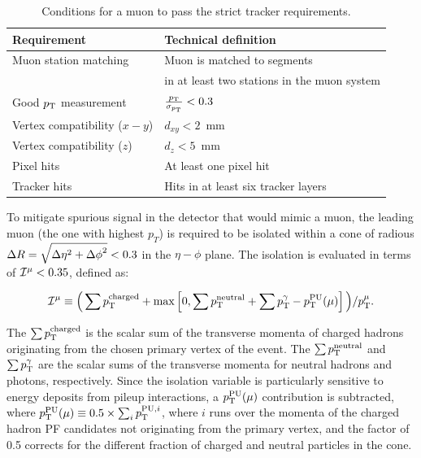 \begin{table}[h]
  \caption{Conditions for a muon to pass the strict tracker requirements.}
    \begin{center}
    \begin{tabular}{l|l}
     \textbf{Requirement}         & \textbf{Technical definition}                 \\
      \hline
      Muon station matching          & Muon is matched to segments           \\
                                     & in at least two stations in the muon system        \\
      \hline                                                          
      Good $p_{\mathrm{T}}$ measurement         & $\frac{p_{\mathrm{T}}}{\sigma_{p_{\mathrm{T}}}} < 0.3$      \\
      \hline
      Vertex compatibility ($x-y$)   & $d_{xy} < 2$~mm                       \\
      \hline
      Vertex compatibility ($z$)     & $d_{z} < 5$~mm                        \\
      \hline
      Pixel hits                     & At least one pixel hit                \\
      \hline
      Tracker hits                   & Hits in at least six tracker layers   \\
      \hline
    \end{tabular}
    
    \label{tab:Tracker_High_pT}
    \end{center}
\end{table}


To mitigate spurious signal in the detector that would mimic a muon, the leading muon (the one with highest $p_T$) is required to be isolated within a cone of radious $\Delta R = \sqrt{\smash[b]{\Delta \eta}^2 + {\Delta \phi}^2}< 0.3$ in the $\eta - \phi$ plane. The isolation is evaluated in terms of ${\cal I}^{\mu} < 0.35$, defined as:


\begin{equation}
\label{eqn:pfiso}
{\cal I}^{\mu} \equiv \Big( \sum p_{\mathrm{T}}^\text{charged} +
                                 \max\left[ 0, \sum p_{\mathrm{T}}^\text{neutral}
                                 +
                                  \sum p_{\mathrm{T}}^{\gamma}
                                 - p_{\mathrm{T}}^\mathrm{PU}(\mu) \right] \Big)
                                 / p_{\mathrm{T}}^{\mu}.
\end{equation}


The $\sum p_{\mathrm{T}}^\text{charged}$ is the scalar sum of the transverse momenta of charged hadrons originating from the chosen primary vertex of the event. The $\sum p_{\mathrm{T}}^\text{neutral}$ and $\sum p_{\mathrm{T}}^{\gamma}$ are the scalar sums of the transverse momenta for neutral hadrons and photons, respectively.  Since the isolation variable is particularly sensitive to energy deposits from pileup interactions, a $p_{\mathrm{T}}^\text{PU}(\mu)$ contribution is subtracted, where $p_{\mathrm{T}}^\mathrm{PU}(\mu) \equiv 0.5 \times \sum_i p_{\mathrm{T}}^{\mathrm{PU}, i}$, where $i$ runs over the momenta of the charged hadron PF candidates not originating from the primary vertex, and the factor of 0.5 corrects for the different fraction of charged and neutral particles in the cone. 


